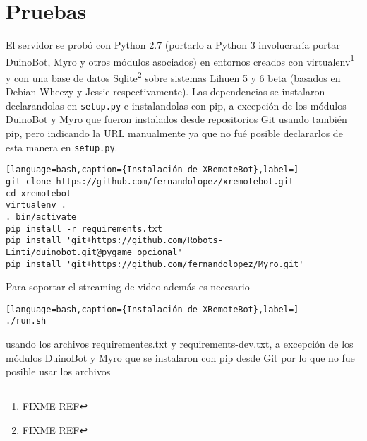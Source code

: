 \chapter{Pruebas}\label{cha:pruebas}

El servidor se probó con Python 2.7 (portarlo a Python 3 involucraría
portar DuinoBot, Myro y otros módulos asociados) en entornos creados
con virtualenv\footnote{FIXME REF} y con una base de datos
Sqlite\footnote{FIXME REF}
sobre
sistemas Lihuen 5 y 6 beta (basados en Debian Wheezy y Jessie respectivamente).
Las dependencias se instalaron declarandolas en \texttt{setup.py} e instalandolas
con pip, a excepción de los módulos DuinoBot y Myro que fueron instalados
desde repositorios Git usando también pip, pero indicando la URL manualmente
ya que no fué posible declararlos de esta manera en \texttt{setup.py}.

\begin{lstlisting}[language=bash,caption={Instalación de XRemoteBot},label=]
git clone https://github.com/fernandolopez/xremotebot.git
cd xremotebot
virtualenv .
. bin/activate
pip install -r requirements.txt
pip install 'git+https://github.com/Robots-Linti/duinobot.git@pygame_opcional'
pip install 'git+https://github.com/fernandolopez/Myro.git'
\end{lstlisting}

Para soportar el streaming de video además es necesario 



\begin{lstlisting}[language=bash,caption={Instalación de XRemoteBot},label=]
./run.sh
\end{lstlisting}

usando los archivos requirementes.txt
y requirements-dev.txt, a excepción de los módulos DuinoBot y Myro que se
instalaron con pip desde Git por lo que no fue posible usar los archivos



